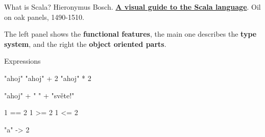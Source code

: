\documentclass[ignorenonframetext,]{beamer}
\newenvironment{Shaded}{\begin{snugshade}}{\end{snugshade}}
\newcommand{\DecValTok}[1]{\textcolor[rgb]{0.00,0.00,0.81}{#1}}
\newcommand{\StringTok}[1]{\textcolor[rgb]{0.31,0.60,0.02}{#1}}
\newcommand{\NormalTok}[1]{#1}
\begin{document}
\begin{frame}[fragile]
\begin{block}{What is Scala?}
Hieronymus Bosch.
\href{https://classicprogrammerpaintings.com/post/142321815809/hieronymus-bosch-a-visual-guide-to-the-scala}{\textbf{A
visual guide to the Scala language}}. Oil on oak panels, 1490-1510.

The left panel shows the \textbf{functional features}, the main one
describes the \textbf{type system}, and the right the \textbf{object
oriented parts}.

\end{block}

\begin{block}{Expressions}

\begin{Shaded}
\end{Shaded}

\begin{Shaded}
\begin{Highlighting}[]
\StringTok{"ahoj"}
\StringTok{"ahoj"}\NormalTok{ + }\DecValTok{2}
\StringTok{"ahoj"}\NormalTok{ * }\DecValTok{2}

\StringTok{"ahoj"}\NormalTok{ + }\StringTok{" "}\NormalTok{ + }\StringTok{"světe!"}
\end{Highlighting}
\end{Shaded}

\begin{Shaded}
\begin{Highlighting}[]
\DecValTok{1}\NormalTok{ == }\DecValTok{2}
\DecValTok{1}\NormalTok{ >= }\DecValTok{2}
\DecValTok{1}\NormalTok{ <= }\DecValTok{2}
\end{Highlighting}
\end{Shaded}

\begin{Shaded}
\begin{Highlighting}[]
\StringTok{"a"}\NormalTok{ -> }\DecValTok{2}
\end{Highlighting}
\end{Shaded}


\end{block}
\end{frame}
\end{document}
